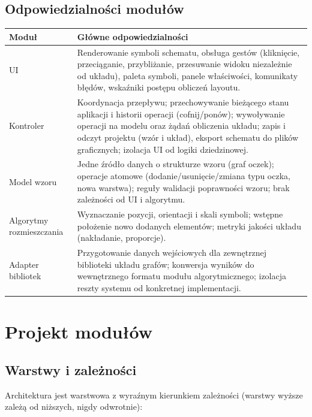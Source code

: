 \documentclass[a4paper,11pt]{article}
\begin{document}
\subsection{Odpowiedzialności modułów}

\begin{tabularx}{0.95\textwidth}{|p{3.4cm}|X|}
  \hline
  \textbf{Moduł} & \textbf{Główne odpowiedzialności} \\
  \hline
  UI & Renderowanie symboli schematu, obsługa gestów (kliknięcie, przeciąganie, przybliżanie, przesuwanie widoku niezależnie od układu), paleta symboli, panele właściwości, komunikaty błędów, wskaźniki postępu obliczeń layoutu. \\
  \hline
  Kontroler & Koordynacja przepływu; przechowywanie bieżącego stanu aplikacji i historii operacji (cofnij/ponów); wywoływanie operacji na modelu oraz żądań obliczenia układu; zapis i odczyt projektu (wzór i układ), eksport schematu do plików graficznych; izolacja UI od logiki dziedzinowej. \\
  \hline
  Model wzoru & Jedne źródło danych o strukturze wzoru (graf oczek); operacje atomowe (dodanie/usunięcie/zmiana typu oczka, nowa warstwa); reguły walidacji poprawności wzoru; brak zależności od UI i algorytmu. \\
  \hline
  Algorytmy rozmieszczania & Wyznaczanie pozycji, orientacji i skali symboli; wstępne położenie nowo dodanych elementów; metryki jakości układu (nakładanie, proporcje). \\
  \hline
  Adapter bibliotek & Przygotowanie danych wejściowych dla zewnętrznej biblioteki układu grafów; konwersja wyników do wewnętrznego formatu modułu algorytmicznego; izolacja reszty systemu od konkretnej implementacji. \\
  \hline
\end{tabularx}

\pagebreak

\section{Projekt modułów}

\subsection{Warstwy i zależności}

Architektura jest warstwowa z wyraźnym kierunkiem zależności (warstwy wyższe zależą od niższych, nigdy odwrotnie):
\end{document}

